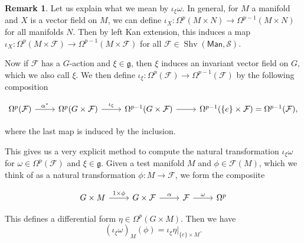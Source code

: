 \documentclass{shortart}
\theoremstyle{definition}
\newtheorem{remark}[thm]{Remark}
\DeclareMathOperator\Shv{Shv}
\newcommand\Man{\mathsf{Man}}
\renewcommand\S{\mathcal{S}}
\begin{document}
\begin{remark}\label{remark:iota}
  Let us explain what we mean by $\iota_\xi \omega$. In general, for $M$ a manifold and $X$ is a vector field on $M$, we can define $\iota_X: \Omega^p(M \times N) \to \Omega^{p - 1}(M \times N)$ for all manifolds $N$. Then by left Kan extension, this induces a map $\iota_X: \Omega^p(M \times \mathcal{F}) \to \Omega^{p - 1}(M \times \mathcal{F})$ for all $\mathcal{F} \in \Shv(\Man, \S)$. 

  Now if $\mathcal{F}$ has a $G$-action and $\xi \in \mathfrak{g}$, then $\xi$ induces an invariant vector field on $G$, which we also call $\xi$. We then define $\iota_\xi: \Omega^p(\mathcal{F}) \to \Omega^{p - 1}(\mathcal{F})$ by the following composition
  \begin{useimager}
    \[
      \begin{tikzcd}
        \Omega^p(\mathcal{F}) \ar[r, "\alpha^*"] & \Omega^p(G \times \mathcal{F}) \ar[r, "\iota_\xi"] & \Omega^{p - 1}(G \times \mathcal{F}) \ar[r] & \Omega^{p - 1}(\{e\} \times \mathcal{F}) = \Omega^{p - 1}(\mathcal{F}),
      \end{tikzcd}
    \]
  \end{useimager}
  where the last map is induced by the inclusion.

  This gives us a very explicit method to compute the natural transformation $\iota_\xi \omega$ for $\omega \in \Omega^p(\mathcal{F})$ and $\xi \in \mathfrak{g}$. Given a test manifold $M$ and $\phi \in \mathcal{F}(M)$, which we think of as a natural transformation $\phi: M \to \mathcal{F}$, we form the composiite
  \begin{useimager}
    \[
      \begin{tikzcd}
        G \times M \ar[r, "1 \times \phi"] & G \times \mathcal{F} \ar[r, "\alpha"] & \mathcal{F} \ar[r, "\omega"] & \Omega^p
      \end{tikzcd}
    \]
  \end{useimager}%
  This defines a differential form $\eta \in \Omega^p(G \times M)$. Then we have
  \[
    (\iota_\xi \omega)_M(\phi) = \iota_{\xi} \eta|_{\{e\} \times M}.
  \]
\end{remark}
\end{document}
